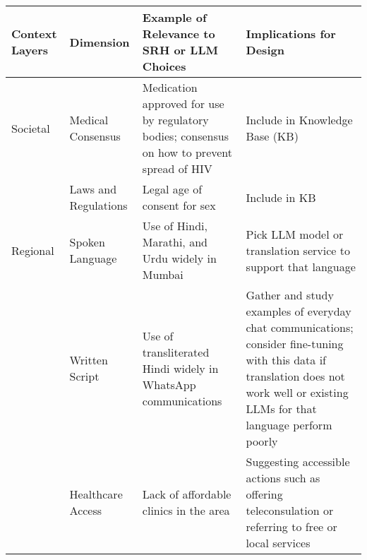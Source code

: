 \begin{table*}[h]
\centering
\small
  \begin{tabular}{>{\raggedright\arraybackslash}p{1.2cm} p{2.6cm} p{4.3cm} p{6cm}}
\toprule
\textbf{Context Layers} &\textbf{Dimension} & \textbf{Example of Relevance to SRH or LLM Choices} & \textbf{Implications for Design} \\
\toprule
Societal  & Medical Consensus & Medication approved for use by regulatory bodies; consensus on how to prevent spread of HIV & Include in Knowledge Base (KB)\\
& Laws and Regulations & Legal age of consent for sex & Include in KB \\
 \hline

Regional & Spoken Language & Use of Hindi, Marathi, and Urdu widely in Mumbai & Pick LLM model or translation service to support that language \\
 & Written Script & Use of transliterated Hindi widely in WhatsApp communications & Gather and study examples of everyday chat communications; consider fine-tuning with this data if translation does not work well or existing LLMs for that language perform poorly\\
 & Healthcare Access & Lack of affordable clinics in the area & Suggesting accessible actions such as offering teleconsulation or referring to free or local services \\
  \hline
  

\end{tabular}
\end{table*}
